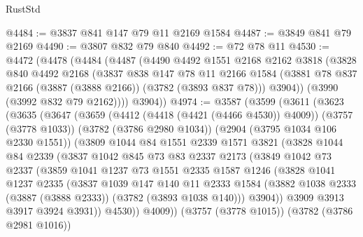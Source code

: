 \begin{lexlean}{RustStd}
\begin{coremodule}
@4484 := @3837 @841 @147 @79 @11 @2169 @1584
@4487 := @3849 @841 @79 @2169
@4490 := @3807 @832 @79 @840
@4492 := @72 @78 @11
@4530 := @4472
    (@4478
      (@4484
        (@4487
          (@4490
            @4492
            @1551
            @2168
            @2162
            @3818
            (@3828
              @840
              @4492
              @2168
              (@3837
                @838
                @147
                @78
                @11
                @2166
                @1584
                (@3881 @78 @837 @2166 (@3887 (@3888 @2166)) (@3782 (@3893 @837 @78)))
                @3904))
            (@3990 (@3992 @832 @79 @2162))))
        @3904))
@4974 := @3587
    (@3599
      (@3611
        (@3623
          (@3635
            (@3647
              (@3659
                (@4412 (@4418 (@4421 (@4466 @4530)) @4009))
                (@3757 (@3778 @1033))
                (@3782 (@3786 @2980 @1034))
                (@2904 (@3795 @1034 @106 @2330 @1551))
                (@3809
                  @1044
                  @84
                  @1551
                  @2339
                  @1571
                  @3821
                  (@3828
                    @1044
                    @84
                    @2339
                    (@3837
                      @1042
                      @845
                      @73
                      @83
                      @2337
                      @2173
                      (@3849
                        @1042
                        @73
                        @2337
                        (@3859
                          @1041
                          @1237
                          @73
                          @1551
                          @2335
                          @1587
                          @1246
                          (@3828
                            @1041
                            @1237
                            @2335
                            (@3837
                              @1039
                              @147
                              @140
                              @11
                              @2333
                              @1584
                              (@3882 @1038 @2333 (@3887 (@3888 @2333)) (@3782 (@3893 @1038 @140)))
                              @3904))
                          @3909
                          @3913
                          @3917
                          @3924
                          @3931))
                      @4530))
                  @4009))
              (@3757 (@3778 @1015))
              (@3782 (@3786 @2981 @1016))

\end{coremodule}
\end{lexlean}
